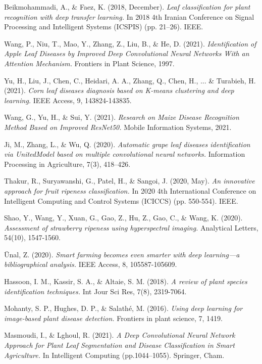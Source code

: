 \begin{thebibliography}{9}
  Beikmohammadi, A., \& Faez, K. (2018, December).
  \emph{Leaf classification for plant recognition with deep transfer learning.}
  In 2018 4th Iranian Conference on Signal Processing and Intelligent Systems
  (ICSPIS) (pp. 21--26). IEEE.

  Wang, P., Niu, T., Mao, Y., Zhang, Z., Liu, B., \& He, D. (2021). 
  \emph{Identification of Apple Leaf Diseases by Improved Deep Convolutional Neural Networks With an Attention Mechanism.} 
  Frontiers in Plant Science, 1997.

  Yu, H., Liu, J., Chen, C., Heidari, A. A., Zhang, Q., Chen, H., ... \& Turabieh, H. (2021). 
  \emph{Corn leaf diseases diagnosis based on K-means clustering and deep learning.} 
  IEEE Access, 9, 143824-143835.

  Wang, G., Yu, H., \& Sui, Y. (2021). 
  \emph{Research on Maize Disease Recognition Method Based on Improved ResNet50.} 
  Mobile Information Systems, 2021.

  Ji, M., Zhang, L., \& Wu, Q. (2020). 
  \emph{Automatic grape leaf diseases identification via UnitedModel based on multiple convolutional neural networks.} 
  Information Processing in Agriculture, 7(3), 418--426.

  Thakur, R., Suryawanshi, G., Patel, H., \& Sangoi, J. (2020, May). 
  \emph{An innovative approach for fruit ripeness classification.} 
  In 2020 4th International Conference on Intelligent Computing and 
  Control Systems (ICICCS) (pp. 550-554). IEEE.

  Shao, Y., Wang, Y., Xuan, G., Gao, Z., Hu, Z., Gao, C., \& Wang, K. (2020). 
  \emph{Assessment of strawberry ripeness using hyperspectral imaging.} 
  Analytical Letters, 54(10), 1547-1560.

  \"Unal, Z. (2020). 
  \emph{Smart farming becomes even smarter with deep learning—a bibliographical analysis.} 
  IEEE Access, 8, 105587-105609.

  Hassoon, I. M., Kassir, S. A., \& Altaie, S. M. (2018). 
  \emph{A review of plant species identification techniques.} 
  Int Jour Sci Res, 7(8), 2319-7064.

  Mohanty, S. P., Hughes, D. P., \& Salathé, M. (2016). 
  \emph{Using deep learning for image-based plant disease detection.} 
  Frontiers in plant science, 7, 1419.

  Masmoudi, I., \& Lghoul, R. (2021). 
  \emph{A Deep Convolutional Neural Network Approach for Plant Leaf Segmentation and Disease Classification in Smart Agriculture.} 
  In Intelligent Computing (pp.1044--1055). Springer, Cham.


\end{thebibliography}
